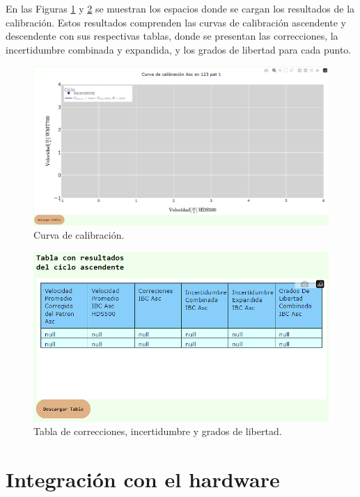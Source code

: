 En las Figuras \ref{fig:curvaCalib} y \ref{fig:tablaCalib} se muestran los espacios donde se cargan los resultados de la calibración. Estos resultados comprenden las curvas de calibración ascendente y descendente con sus respectivas tablas, donde se presentan las correcciones, la incertidumbre combinada y expandida, y los grados de libertad para cada punto.

\begin{figure}[H]
    \centering
    \includegraphics[width=0.9\linewidth]{Figuras/AplicacionWeb/frondend/curvaCalib.png}
    \caption{Curva de calibración.}
    \label{fig:curvaCalib}
\end{figure}

\begin{figure}[H]
    \centering
    \includegraphics[width=0.7\linewidth]{Figuras/AplicacionWeb/frondend/tablaCalib.png}
    \caption{Tabla de correcciones, incertidumbre y grados de libertad.}
    \label{fig:tablaCalib}
\end{figure}

\section{Integración con el hardware}\label{sec:integracionHardware}


